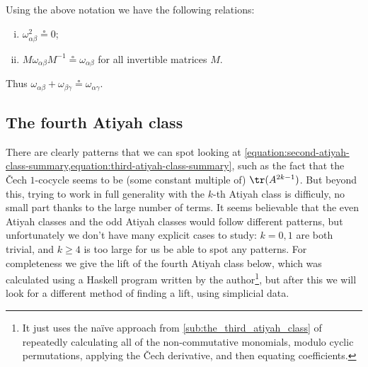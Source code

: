             \begin{note}\label{note:relations-with-circeq}
                Using the above notation we have the following relations:
                \begin{enumerate}[(i)]
                    \item $\omega_{\alpha\beta}^2\circeq0$;
                    \item $M\omega_{\alpha\beta}M^{-1}\circeq\omega_{\alpha\beta}$ for all invertible matrices $M$.
                \end{enumerate}
                Thus $\omega_{\alpha\beta}+\omega_{\beta\gamma}\circeq\omega_{\alpha\gamma}$.
            \end{note}


    \subsection{The fourth Atiyah class} %
    \label{sub:the_fourth_atiyah_class}

        There are clearly patterns that we can spot looking at \cref{equation:second-atiyah-class-summary,equation:third-atiyah-class-summary}, such as the fact that the Čech $1$-cocycle seems to be (some constant multiple of) $\tr(A^{2k-1})$.
        But beyond this, trying to work in full generality with the $k$-th Atiyah class is difficuly, no small part thanks to the large number of terms.
        It seems believable that the even Atiyah classes and the odd Atiyah classes would follow different patterns, but unfortunately we don't have many explicit cases to study: $k=0,1$ are both trivial, and $k\geqslant4$ is too large for us be able to spot any patterns.
        For completeness we give the lift of the fourth Atiyah class below, which was calculated using a Haskell program written by the author\footnote{It just uses the naïve approach from \cref{sub:the_third_atiyah_class} of repeatedly calculating all of the non-commutative monomials, modulo cyclic permutations, applying the Čech derivative, and then equating coefficients.}, but after this we will look for a different method of finding a lift, using simplicial data.

        \bigskip


